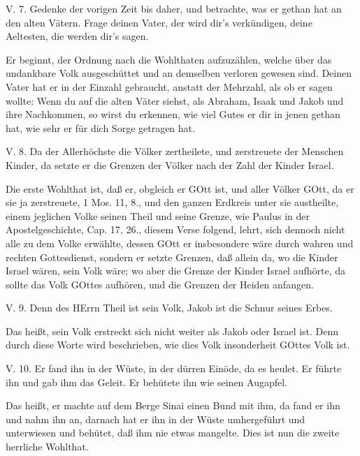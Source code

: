 \begin{schriftzitat}
V. 7. Gedenke der vorigen Zeit bis daher, und betrachte, was er gethan hat an den alten Vätern. Frage deinen Vater, der wird dir’s verkündigen, deine Aeltesten, die werden dir’s sagen.
\end{schriftzitat}

Er beginnt, der Ordnung nach die Wohlthaten aufzuzählen, welche über das undankbare Volk ausgeschüttet und an demselben verloren gewesen sind. Deinen Vater hat er in der Einzahl gebraucht, anstatt der Mehrzahl, als ob er sagen wollte: Wenn du auf die alten Väter siehst, als Abraham, Isaak und Jakob und ihre Nachkommen, so wirst du erkennen, wie viel Gutes er dir in jenen gethan hat, wie sehr er für dich Sorge getragen hat.

\begin{schriftzitat}
V. 8. Da der Allerhöchste die Völker zertheilete, und zerstreuete der Menschen Kinder, da setzte er die Grenzen der Völker nach der Zahl der Kinder Israel.
\end{schriftzitat}

Die erste Wohlthat ist, daß er, obgleich er GOtt ist, und aller Völker GOtt, da er sie ja zerstreuete, 1 Mos. 11, 8., und den ganzen Erdkreis unter sie austheilte, einem jeglichen Volke seinen Theil und seine Grenze, wie Paulus in der Apostelgeschichte, Cap. 17, 26., diesem Verse folgend, lehrt, sich dennoch nicht alle zu dem Volke erwählte, dessen GOtt er insbesondere wäre durch wahren und rechten Gottesdienst, sondern er setzte Grenzen, daß allein da, wo die Kinder Israel wären, sein Volk wäre; wo aber
die Grenze der Kinder Israel aufhörte, da sollte das Volk GOttes aufhören, und die Grenzen der Heiden anfangen.

\begin{schriftzitat}
V. 9. Denn des HErrn Theil ist sein Volk, Jakob ist die Schnur seines Erbes.
\end{schriftzitat}

Das heißt, sein Volk erstreckt sich nicht weiter als Jakob oder Israel ist. Denn durch diese Worte wird beschrieben, wie dies Volk insonderheit GOttes Volk ist.

\begin{schriftzitat}
V. 10. Er fand ihn in der Wüste, in der dürren Einöde, da es heulet. Er führte ihn und gab ihm das Geleit. Er behütete ihn wie seinen Augapfel.
\end{schriftzitat}

Das heißt, er machte auf dem Berge Sinai einen Bund mit ihm, da fand er ihn und nahm ihn an, darnach hat er ihn in der Wüste umhergeführt und unterwiesen und behütet, daß ihm nie etwas mangelte. Dies ist nun die zweite herrliche Wohlthat.

